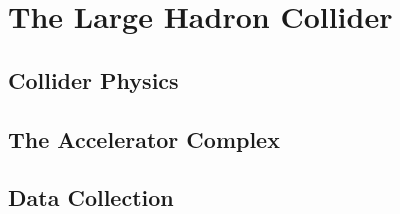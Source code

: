 \chapter{The Large Hadron Collider}
\label{sec:lhc}





\section{Collider Physics}
\section{The Accelerator Complex}
\section{Data Collection}
